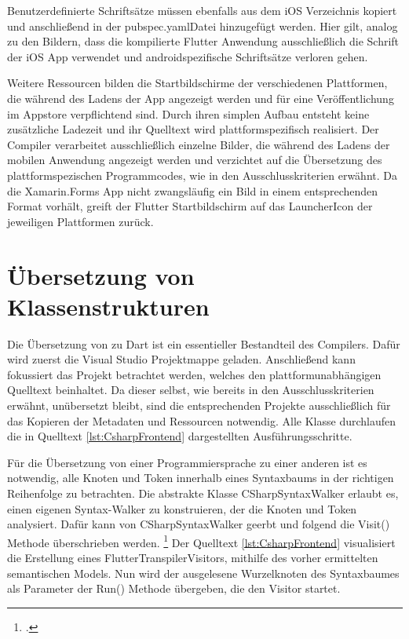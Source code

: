  


Benutzerdefinierte Schriftsätze müssen ebenfalls aus dem iOS Verzeichnis kopiert und anschließend in der \glq pubspec.yaml\grq Datei hinzugefügt werden.  Hier gilt,  analog zu den Bildern,  dass die kompilierte Flutter Anwendung ausschließlich die Schrift der iOS App verwendet und androidspezifische Schriftsätze verloren gehen.

Weitere Ressourcen bilden die Startbildschirme der verschiedenen Plattformen,  die während des Ladens der App angezeigt werden und für eine Veröffentlichung im Appstore verpflichtend sind.  Durch ihren simplen Aufbau entsteht keine zusätzliche Ladezeit und ihr Quelltext wird plattformspezifisch realisiert.  Der Compiler verarbeitet ausschließlich einzelne Bilder, die während des Ladens der mobilen Anwendung angezeigt werden und verzichtet auf die Übersetzung des plattformspezischen Programmcodes,  wie in den Ausschlusskriterien erwähnt.  Da die Xamarin.Forms App nicht zwangsläufig ein Bild in einem entsprechenden Format vorhält,  greift der Flutter Startbildschirm auf das LauncherIcon der jeweiligen Plattformen zurück.  

\section{Übersetzung von Klassenstrukturen}

Die Übersetzung von \Csharp{} zu Dart ist ein essentieller Bestandteil des Compilers.  Dafür wird zuerst die Visual Studio Projektmappe geladen.  Anschließend kann fokussiert das Projekt betrachtet werden, welches den plattformunabhängigen Quelltext beinhaltet.  Da dieser selbst, wie bereits in den Ausschlusskriterien erwähnt,  unübersetzt bleibt, sind die entsprechenden Projekte ausschließlich für das Kopieren der Metadaten und Ressourcen notwendig.  Alle Klasse durchlaufen die in Quelltext \ref{lst:CsharpFrontend} dargestellten Ausführungsschritte. 

Für die Übersetzung von einer Programmiersprache zu einer anderen ist es notwendig,  alle Knoten und Token innerhalb eines Syntaxbaums in der richtigen Reihenfolge zu betrachten.  Die abstrakte Klasse \glq CSharpSyntaxWalker\grq{} erlaubt es,  einen eigenen \glq Syntax-Walker\grq{} zu konstruieren,  der die Knoten und Token analysiert.  Dafür kann von \glq CSharpSyntaxWalker\grq{} geerbt und folgend die \glq Visit()\grq{} Methode überschrieben werden.  \footcite[Vgl.][Abgerufen am \today]{Varty2014}  Der Quelltext \ref{lst:CsharpFrontend} visualisiert die Erstellung eines \glq FlutterTranspilerVisitors\grq ,  mithilfe des vorher ermittelten semantischen Models.  Nun wird der ausgelesene Wurzelknoten des Syntaxbaumes als Parameter der \glq Run()\grq{} Methode übergeben,  die den \glq Visitor\grq{} startet.  

